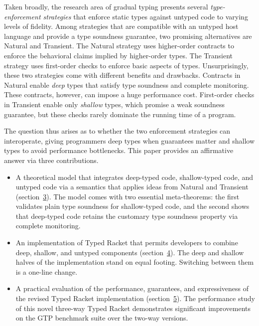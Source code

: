 \documentclass[screen=true, natbib=false, 10pt, sigplan]{acmart}
\newcommand{\ChapRef}[2]{\SecRef{#1}{#2}}
\newcommand{\SecRef}[2]{section~#1}
\newcommand{\SectionNumberLink}[2]{\hyperref[#1]{#2}}
\newlength{\stabLeft}
\newcommand{\atItemizeStart}[0]{\addtolength{\stabLeft}{\labelsep}
                                \addtolength{\stabLeft}{\labelwidth}}
\begin{document}
Taken broadly, the research area of gradual typing presents several
\emph{type{-}enforcement strategies} that enforce static types against
untyped code to varying levels of fidelity.
Among strategies that are compatible with an untyped
host language and provide a type soundness guarantee, two promising
alternatives are Natural
and Transient.
The Natural strategy uses higher{-}order contracts to enforce the
behavioral claims implied by higher{-}order types.
The Transient strategy uses first{-}order checks to enforce basic aspects
of types.
Unsurprisingly, these two strategies come with
different benefits and drawbacks.
Contracts in Natural enable \emph{deep} types
that satisfy type soundness and complete monitoring.
These contracts, however, can impose a huge performance cost.
First{-}order checks in Transient enable only \emph{shallow} types,
which promise a weak soundness guarantee,
but these checks rarely dominate the running time of a program.

The question thus arises as to whether the two enforcement strategies can
interoperate, giving programmers deep types
when guarantees matter and shallow types to avoid performance bottlenecks.
This paper provides an affirmative answer
via three contributions.

\begin{itemize}\atItemizeStart

\item A theoretical model that integrates deep{-}typed code,
shallow{-}typed code, and untyped code via a semantics that
applies ideas from Natural and Transient (\ChapRef{\SectionNumberLink{t:x28part_x22secx3amodelx22x29}{3}}{Model and Metatheory}).
The model comes with two essential meta{-}theorems: the first
validates plain type soundness for shallow{-}typed code, and the
second shows that deep{-}typed code retains the customary type
soundness property via complete monitoring.

\item An implementation of Typed Racket
that permits developers to combine deep, shallow, and
untyped components (\ChapRef{\SectionNumberLink{t:x28part_x22secx3aimplementationx22x29}{4}}{Implementation Challenges}).
The deep and shallow halves of the implementation stand on
equal footing.
Switching between them is a one{-}line change.

\item A practical evaluation of the performance, guarantees, and
expressiveness of the revised Typed Racket implementation
(\ChapRef{\SectionNumberLink{t:x28part_x22secx3aevaluationx22x29}{5}}{Evaluation}).  The performance study of this novel three{-}way
Typed Racket demonstrates significant improvements on the GTP
benchmark suite over the two{-}way versions.\end{itemize}
\end{document}
